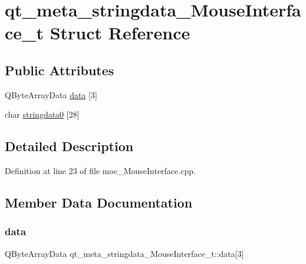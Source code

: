 \hypertarget{structqt__meta__stringdata___mouse_interface__t}{}\section{qt\+\_\+meta\+\_\+stringdata\+\_\+\+Mouse\+Interface\+\_\+t Struct Reference}
\label{structqt__meta__stringdata___mouse_interface__t}
\subsection*{Public Attributes}
\begin{DoxyCompactItemize}
\item 
Q\+Byte\+Array\+Data \hyperlink{structqt__meta__stringdata___mouse_interface__t_a0dd2b6d70dbad42c02a73b9ab85b0827}{data} \mbox{[}3\mbox{]}
\item 
char \hyperlink{structqt__meta__stringdata___mouse_interface__t_af2814745e298ad7bf47432922ee4bbb3}{stringdata0} \mbox{[}28\mbox{]}
\end{DoxyCompactItemize}


\subsection{Detailed Description}


Definition at line 23 of file moc\+\_\+\+Mouse\+Interface.\+cpp.



\subsection{Member Data Documentation}
\mbox{\label{structqt__meta__stringdata___mouse_interface__t_a0dd2b6d70dbad42c02a73b9ab85b0827}} 
\subsubsection{\texorpdfstring{data}{data}}
{\footnotesize\ttfamily Q\+Byte\+Array\+Data qt\+\_\+meta\+\_\+stringdata\+\_\+\+Mouse\+Interface\+\_\+t\+::data\mbox{[}3\mbox{]}}



